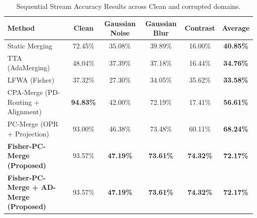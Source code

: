 \documentclass{article}
\theoremstyle{plain}
\theoremstyle{definition}
\theoremstyle{remark}
\begin{document}
\begin{table}[t]
\caption{Sequential Stream Accuracy Results across Clean and corrupted domains.}
\label{tab:sequential_results}
\vskip 0.15in
\begin{center}
\begin{small}
\begin{sc}
\begin{tabular}{lccccc}
\toprule
Method & Clean & Gaussian Noise & Gaussian Blur & Contrast & Average \\
\midrule
Static Merging & 72.45\% & 35.08\% & 39.89\% & 16.00\% & \textbf{40.85\%} \\
TTA (AdaMerging) & 48.04\% & 37.39\% & 37.18\% & 16.44\% & \textbf{34.76\%} \\
LFWA (Fisher) & 37.32\% & 27.30\% & 34.05\% & 35.62\% & \textbf{33.58\%} \\
CPA-Merge (PD-Routing + Alignment) & \textbf{94.83\%} & 42.00\% & 72.19\% & 17.41\% & \textbf{56.61\%} \\
PC-Merge (OPR + Projection) & 93.00\% & 46.38\% & 73.48\% & 60.11\% & \textbf{68.24\%} \\
\textbf{Fisher-PC-Merge (Proposed)} & 93.57\% & \textbf{47.19\%} & \textbf{73.61\%} & \textbf{74.32\%} & \textbf{72.17\%} \\
\textbf{Fisher-PC-Merge + AD-Merge (Proposed)} & 93.57\% & \textbf{47.19\%} & \textbf{73.61\%} & \textbf{74.32\%} & \textbf{72.17\%} \\
\bottomrule
\end{tabular}
\end{sc}
\end{small}
\end{center}
\vskip -0.1in
\end{table}
\end{document}
